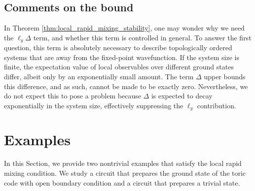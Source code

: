 \documentclass[prx,aps,amsmath,amssymb,floatfix,superscriptaddress,11pt,tightenlines,longbibliography,onecolumn,notitlepage]{revtex4-1}
\begin{document}
\subsection{Comments on the bound}
In Theorem \ref{thm:local_rapid_mixing_stability}, one may wonder why we need the $\ell_y \Delta$ term, and whether this term is controlled in general. To answer the first question, this term is absolutely necessary to describe topologically ordered systems that are away from the fixed-point wavefunction. If the system size is finite, the expectation value of local observables over different ground states differ, albeit only by an exponentially small amount. The term $\Delta$ upper bounds this difference, and as such, cannot be made to be exactly zero. Nevertheless, we do not expect this to pose a problem because $\Delta$ is expected to decay exponentially in the system size, effectively suppressing the $\ell_y$ contribution.

\section{Examples \label{section:examples}}
In this Section, we provide two nontrivial examples that satisfy the local rapid mixing condition. We study a circuit that prepares the ground state of the toric code\cite{Kitaev2003} with open boundary condition\cite{Bravyi1998} and a circuit that prepares a trivial state.
\end{document}
